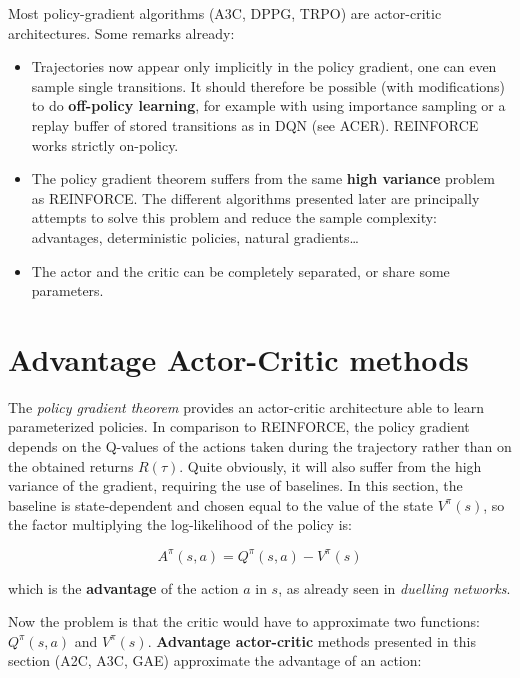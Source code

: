 \documentclass[
  letterpaper,
  DIV=11,
  numbers=noendperiod]{scrreprt}
\providecommand{\tightlist}{%
  \setlength{\itemsep}{0pt}\setlength{\parskip}{0pt}}\usepackage{longtable,booktabs,array}
\begin{document}
Most policy-gradient algorithms (A3C, DPPG, TRPO) are actor-critic
architectures. Some remarks already:

\begin{itemize}
\tightlist
\item
  Trajectories now appear only implicitly in the policy gradient, one
  can even sample single transitions. It should therefore be possible
  (with modifications) to do \textbf{off-policy learning}, for example
  with using importance sampling or a replay buffer of stored
  transitions as in DQN (see ACER). REINFORCE works strictly on-policy.
\item
  The policy gradient theorem suffers from the same \textbf{high
  variance} problem as REINFORCE. The different algorithms presented
  later are principally attempts to solve this problem and reduce the
  sample complexity: advantages, deterministic policies, natural
  gradients\ldots{}
\item
  The actor and the critic can be completely separated, or share some
  parameters.
\end{itemize}


\hypertarget{advantage-actor-critic-methods}{%
\chapter{Advantage Actor-Critic
methods}\label{advantage-actor-critic-methods}}

The \emph{policy gradient theorem} provides an actor-critic architecture
able to learn parameterized policies. In comparison to REINFORCE, the
policy gradient depends on the Q-values of the actions taken during the
trajectory rather than on the obtained returns \(R(\tau)\). Quite
obviously, it will also suffer from the high variance of the gradient,
requiring the use of baselines. In this section, the baseline is
state-dependent and chosen equal to the value of the state \(V^\pi(s)\),
so the factor multiplying the log-likelihood of the policy is:

\[
    A^{\pi}(s, a) = Q^{\pi}(s, a) - V^\pi(s)
\]

which is the \textbf{advantage} of the action \(a\) in \(s\), as already
seen in \emph{duelling networks}.

Now the problem is that the critic would have to approximate two
functions: \(Q^{\pi}(s, a)\) and \(V^{\pi}(s)\). \textbf{Advantage
actor-critic} methods presented in this section (A2C, A3C, GAE)
approximate the advantage of an action:
\end{document}
